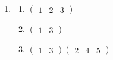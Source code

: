 \begin{enumerate}
    \item \begin{enumerate}[label=(\alph*)]
        \item $\begin{pmatrix}1 & 2 & 3\end{pmatrix}$
        \item $\begin{pmatrix}1 & 3\end{pmatrix}$
        \item $\begin{pmatrix}1 & 3\end{pmatrix}\begin{pmatrix}2 & 4 & 5\end{pmatrix}$
    \end{enumerate}


\end{enumerate}
